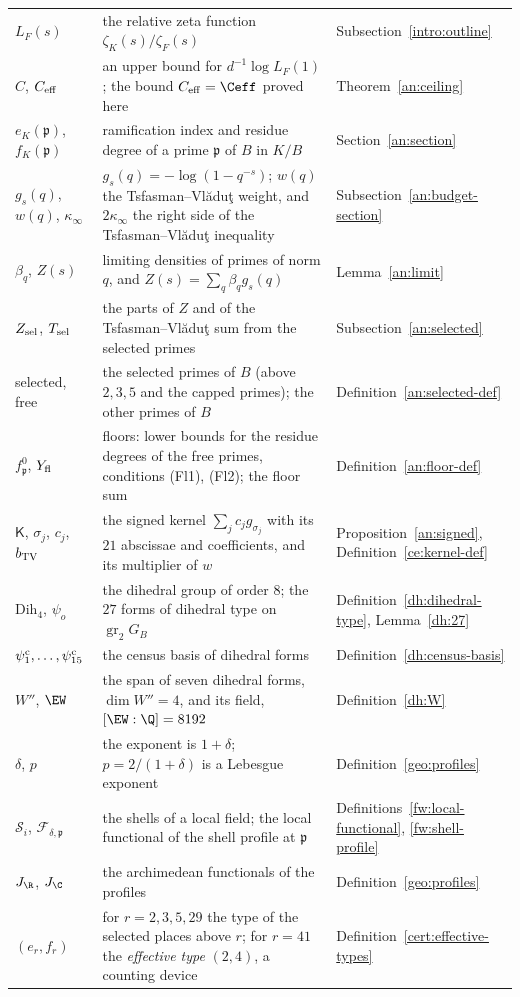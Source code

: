 {\begin{longtable}{@{}>{\raggedright\arraybackslash}p{}>{\raggedright\arraybackslash}p{}>{\raggedright\arraybackslash}p{}@{}}
$L_F(s)$ & the relative zeta function $\zeta_K(s)/\zeta_F(s)$ & Subsection~\ref{intro:outline}\\
$C$, $C_{\rm eff}$ & an upper bound for $d^{-1}\log L_F(1)$; the bound $C_{\rm eff}=\Ceff$ proved here & Theorem~\ref{an:ceiling}\\
$e_K(\mathfrak p)$, $f_K(\mathfrak p)$ & ramification index and residue degree of a prime $\mathfrak p$ of $B$ in $K/B$ & Section~\ref{an:section}\\
$g_s(q)$, $w(q)$, $\kappa_\infty$ & $g_s(q)=-\log(1-q^{-s})$; $w(q)$ the Tsfasman--Vl\u{a}du\c{t} weight, and $2\kappa_\infty$ the right side of the Tsfasman--Vl\u{a}du\c{t} inequality & Subsection~\ref{an:budget-section}\\
$\beta_q$, $Z(s)$ & limiting densities of primes of norm $q$, and $Z(s)=\sum_q\beta_qg_s(q)$ & Lemma~\ref{an:limit}\\
$Z_{\rm sel}$, $T_{\rm sel}$ & the parts of $Z$ and of the Tsfasman--Vl\u{a}du\c{t} sum from the selected primes & Subsection~\ref{an:selected}\\
selected, free & the selected primes of $B$ (above $2,3,5$ and the capped primes); the other primes of $B$ & Definition~\ref{an:selected-def}\\
$f^0_{\mathfrak p}$, $Y_{\rm fl}$ & floors: lower bounds for the residue degrees of the free primes, conditions (Fl1), (Fl2); the floor sum & Definition~\ref{an:floor-def}\\
$\mathsf K$, $\sigma_j$, $c_j$, $b_{\rm TV}$ & the signed kernel $\sum_jc_jg_{\sigma_j}$ with its $21$ abscissae and coefficients, and its multiplier of $w$ & Proposition~\ref{an:signed}, Definition~\ref{ce:kernel-def}\\
$\mathrm{Dih}_4$, $\psi_o$ & the dihedral group of order $8$; the $27$ forms of dihedral type on $\operatorname{gr}_2G_B$ & Definition~\ref{dh:dihedral-type}, Lemma~\ref{dh:27}\\
$\psi^{\rm c}_1,\dots,\psi^{\rm c}_{15}$ & the census basis of dihedral forms & Definition~\ref{dh:census-basis}\\
$W''$, $\EW$ & the span of seven dihedral forms, $\dim W''=4$, and its field, $[\EW:\Q]=8192$ & Definition~\ref{dh:W}\\
$\delta$, $p$ & the exponent is $1+\delta$; $p=2/(1+\delta)$ is a Lebesgue exponent & Definition~\ref{geo:profiles}\\
$\mathcal S_i$, $\mathcal F_{\delta,\mathfrak p}$ & the shells of a local field; the local functional of the shell profile at $\mathfrak p$ & Definitions~\ref{fw:local-functional}, \ref{fw:shell-profile}\\
$J_\R$, $J_\C$ & the archimedean functionals of the profiles & Definition~\ref{geo:profiles}\\
$(e_r,f_r)$ & for $r=2,3,5,29$ the type of the selected places above $r$; for $r=41$ the
 \emph{effective type} $(2,4)$, a counting device & Definition~\ref{cert:effective-types}\\
\bottomrule
\end{longtable}}

